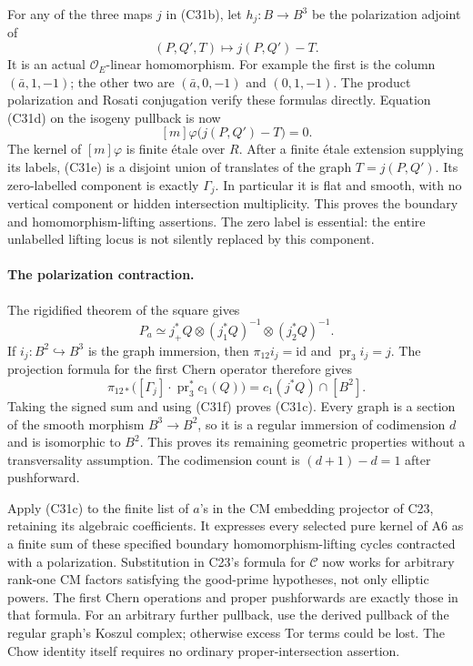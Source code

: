 \documentclass[11pt]{article}
\theoremstyle{definition}\newtheorem{definition}[theorem]{Definition}\newtheorem{remark}[theorem]{Remark}
\begin{document}
For any of the three maps $j$ in (C31b), let
$h_j:B\to B^3$ be the polarization adjoint of
\[
                 (P,Q',T)\longmapsto j(P,Q')-T.
\]
It is an actual $\mathcal O_E$-linear homomorphism.
For example the first is the column $(\bar a,1,-1)$;
the other two are $(\bar a,0,-1)$ and $(0,1,-1)$.
The product polarization and Rosati conjugation verify
these formulas directly. Equation (C31d) on the isogeny
pullback is now
\[
               [m]\varphi\bigl(j(P,Q')-T\bigr)=0.
 \tag{C31e}
\]
The kernel of $[m]\varphi$ is finite \'etale over
$R$. After a finite \'etale extension supplying its
labels, (C31e) is a disjoint union of translates of the
graph $T=j(P,Q')$. Its zero-labelled component is exactly
$\Gamma_j$. In particular it is flat and smooth, with
no vertical component or hidden intersection multiplicity.
This proves the boundary and homomorphism-lifting assertions.
The zero label is essential: the entire unlabelled
lifting locus is not silently replaced by this component.

\paragraph{The polarization contraction.}
The rigidified theorem of the square gives
\[
 P_a\simeq j_+^*Q\otimes(j_1^*Q)^{-1}
                         \otimes(j_2^*Q)^{-1}.
 \tag{C31f}
\]
If $i_j:B^2\hookrightarrow B^3$ is the graph immersion,
then $\pi_{12}i_j=\mathrm{id}$ and
$\operatorname{pr}_3i_j=j$. The projection formula for
the first Chern operator therefore gives
\[
 \pi_{12*}\bigl([\Gamma_j]\cdot
                  \operatorname{pr}_3^*c_1(Q)\bigr)
     =c_1(j^*Q)\cap[B^2].
 \tag{C31g}
\]
Taking the signed sum and using (C31f) proves (C31c).
Every graph is a section of the smooth morphism
$B^3\to B^2$, so it is a regular immersion of codimension
$d$ and is isomorphic to $B^2$. This proves its remaining
geometric properties without a transversality assumption.
The codimension count is $(d+1)-d=1$ after pushforward.

Apply (C31c) to the finite list of $a$'s in the CM
embedding projector of C23, retaining its algebraic
coefficients. It expresses every selected pure kernel of
A6 as a finite sum of these specified boundary
homomorphism-lifting cycles contracted with a polarization.
Substitution in C23's formula for $\mathcal C$ now works
for arbitrary rank-one CM factors satisfying the good-prime
hypotheses, not only elliptic powers. The first Chern
operations and proper pushforwards are exactly those in
that formula. For an arbitrary further pullback, use the
derived pullback of the regular graph's Koszul complex;
otherwise excess Tor terms could be lost. The Chow identity
itself requires no ordinary proper-intersection assertion.
\end{document}

